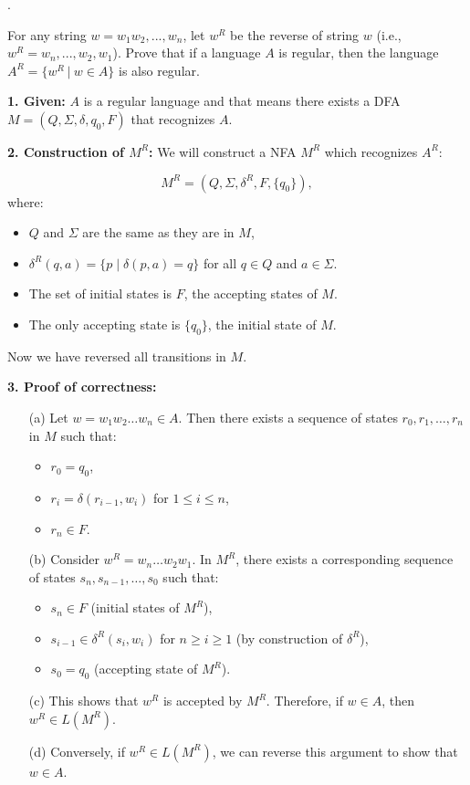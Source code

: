 \documentclass[12pt]{article}
\newcounter{quesnum}
\newcommand{\question}[2][??]{
\begin{list}{\labelitemi}{\leftmargin=2em}
\item [\arabic{quesnum}.] {} {#2}
\end{list}
\addtocounter{quesnum}{1}
}
\begin{document}
\vspace{12pt}

\question[3]{
For any string $w = w_1w_2,...,w_n$, let $w^R$ be the reverse of string $w$ (i.e., $w^R=w_n,...,w_2,w_1$). Prove that if a language $A$ is regular, then the language $A^R = \{w^R \ | \ w \in A\}$ is also regular.


}


\textbf{1. Given:} $A$ is a regular language and that means there exists a DFA $M = (Q, \Sigma, \delta, q_0, F)$ that recognizes $A$.

\textbf{2. Construction of $M^R$:}  
We will construct a NFA $M^R$ which recognizes $A^R$:

\[
M^R = (Q, \Sigma, \delta^R, F, \{q_0\}),
\]
where:
\begin{itemize}
    \item $Q$ and $\Sigma$ are the same as they are in $M$,
    \item $\delta^R(q, a) = \{p \mid \delta(p, a) = q\}$ for all $q \in Q$ and $a \in \Sigma$.
    \item The set of initial states is $F$, the accepting states of $M$.
    \item The only accepting state is $\{q_0\}$, the initial state of $M$.
\end{itemize}

Now we have reversed all transitions in $M$.

\textbf{3. Proof of correctness:}  

\begin{itemize}
    \item[(a)] Let $w = w_1w_2\ldots w_n \in A$. Then there exists a sequence of states $r_0, r_1, \ldots, r_n$ in $M$ such that:
    \begin{itemize}
        \item $r_0 = q_0$,
        \item $r_i = \delta(r_{i-1}, w_i)$ for $1 \leq i \leq n$,
        \item $r_n \in F$.
    \end{itemize}

    \item[(b)] Consider $w^R = w_n \ldots w_2w_1$. In $M^R$, there exists a corresponding sequence of states $s_n, s_{n-1}, \ldots, s_0$ such that:
    \begin{itemize}
        \item $s_n \in F$ (initial states of $M^R$),
        \item $s_{i-1} \in \delta^R(s_i, w_i)$ for $n \geq i \geq 1$ (by construction of $\delta^R$),
        \item $s_0 = q_0$ (accepting state of $M^R$).
    \end{itemize}

    \item[(c)] This shows that $w^R$ is accepted by $M^R$. Therefore, if $w \in A$, then $w^R \in L(M^R)$.

    \item[(d)] Conversely, if $w^R \in L(M^R)$, we can reverse this argument to show that $w \in A$.
\end{itemize}
\end{document}
